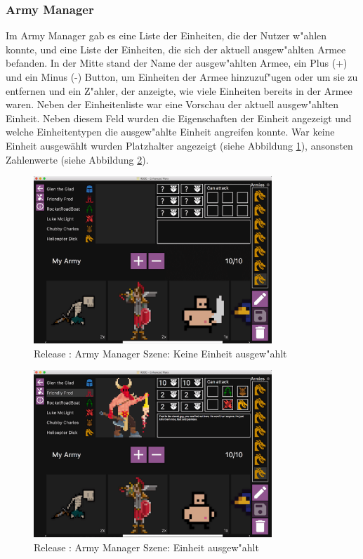 \documentclass[12pt, titlepage]{scrartcl}
\newcommand{\RN}[1]{%
	\textup{\uppercase\expandafter{\romannumeral#1}}%
}
\begin{document}
		    \subsubsection{Army Manager}
		        Im Army Manager gab es eine Liste der Einheiten, die der Nutzer w"ahlen konnte, und eine Liste der Einheiten, die sich der aktuell ausgew"ahlten Armee befanden. In der Mitte stand der Name der ausgew"ahlten Armee, ein Plus (+) und ein Minus (-) Button, um Einheiten der Armee hinzuzuf"ugen oder um sie zu entfernen und ein Z"ahler, der anzeigte, wie viele Einheiten bereits in der Armee waren. Neben der Einheitenliste war eine Vorschau der aktuell ausgew"ahlten Einheit. Neben diesem Feld wurden die Eigenschaften der Einheit angezeigt und welche Einheitentypen die ausgew"ahlte Einheit angreifen konnte. War keine Einheit ausgew\"ahlt wurden Platzhalter angezeigt (siehe Abbildung \ref{Army_Manager_No_Unit_Selected}), ansonsten Zahlenwerte (siehe Abbildung \ref{Army_Manager_Unit_Selected}). \\
		        \begin{figure}[H] 
    				\centering
    				\includegraphics[width=0.8\textwidth]{images/old_state/army_manager/NoUnitSelected.png}
    				\caption{Release \RN{2}: Army Manager Szene: Keine Einheit ausgew"ahlt}
    				\label{Army_Manager_No_Unit_Selected}
			    \end{figure}
			    \begin{figure}[H] 
    				\centering
    				\includegraphics[width=0.8\textwidth]{images/old_state/army_manager/UnitSelected.png}
    				\caption{Release \RN{2}: Army Manager Szene: Einheit ausgew"ahlt}
    				\label{Army_Manager_Unit_Selected}
			    \end{figure}
\end{document}
